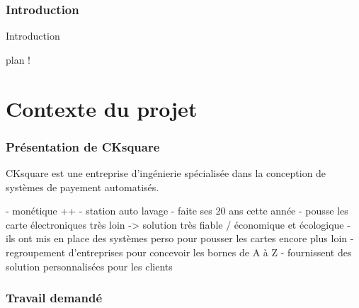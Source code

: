 \documentclass[a4paper]{article}
\begin{document}
\clearpage{}

\pagestyle{plain}
\setcounter{page}{1}
\clearpage
\section*{Introduction}

Introduction

plan !

\clearpage{}



\part{Contexte du projet}

\section{Présentation de CKsquare}

CKsquare est une entreprise d'ingénierie spécialisée dans la conception de
systèmes de payement automatisés.

- monétique ++
- station auto lavage
- faite ses 20 ans cette année
- pousse les carte électroniques très loin -> solution très fiable / économique
  et écologique
- ils ont mis en place des systèmes perso pour pousser les cartes encore plus
  loin
- regroupement d'entreprises pour concevoir les bornes de A à Z
- fournissent des solution personnalisées pour les clients

\section{Travail demandé}
\end{document}
